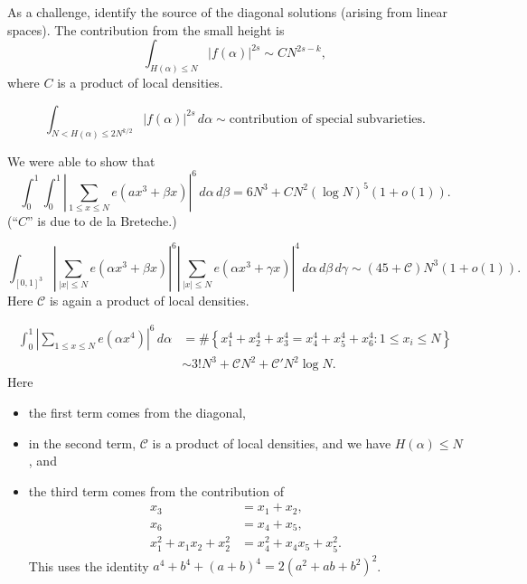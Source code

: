 \documentclass[reqno]{amsart} 
\numberwithin{theorem}{section}
\numberwithin{equation}{section}
\begin{document}
As a challenge, identify the source of the diagonal solutions (arising from linear spaces).  The contribution from the small height is
\begin{equation*}
  \int_{H(\alpha) \leq N} \left\lvert f(\alpha) \right\rvert^{2 s} \sim C N^{2 s - k},
\end{equation*}
where $C$ is a product of local densities.
\begin{conjecture}
  \begin{equation*}
    \int_{N < H(\alpha) \leq 2 N^{k/2}}
    \left\lvert f(\alpha) \right\rvert^{2 s} \, d \alpha \sim \text{contribution of special subvarieties}.
  \end{equation*}
\end{conjecture}
\begin{example}
  We were able to show that
  \begin{equation*}
    \int_0^1 \int_0^1 \left\lvert \sum_{1 \leq x \leq N} e(a x^3 + \beta x) \right\rvert^6
    \, d \alpha \, d \beta = 6 N^3 + C N^2(\log N)^5(1 + o(1)).
  \end{equation*}
  (``$C$'' is due to de la Breteche.)
\end{example}
\begin{example}
  \begin{equation*}
    \int_{[0, 1]^3} \left\lvert \sum_{\lvert x \rvert \leq N} e(\alpha x^3 + \beta x) \right\rvert^6
    \left\lvert \sum_{\lvert x \rvert \leq N} e(\alpha x^3 + \gamma x) \right\rvert^4
    \, d \alpha \, d \beta \, d \gamma
    \sim
    (45 + \mathcal{C}) N^3(1 + o(1)).
  \end{equation*}
  Here $\mathcal{C}$ is again a product of local densities.
\end{example}
\begin{example}
  \begin{align*}
    \int_0^1 \left\lvert \sum_{1 \leq x \leq N}
    e(\alpha x^4)\right\rvert^6 \, d \alpha
    &=
      \# \left\{ x_1^4 + x_2^4 + x_3^4 = x_4^4 + x_5^4 + x_6^4 : 1 \leq x_i \leq N \right\} \\
    &\sim 3! N^3 + \mathcal{C} N^2
      + \mathcal{C} ' N^2 \log N.
  \end{align*}
  Here
  \begin{itemize}
  \item the first term comes from the diagonal,
  \item in the second term, $\mathcal{C}$ is a product of local densities, and we have $H(\alpha) \leq N$, and
  \item the third term comes from the contribution of
    \begin{align*}
      x_3 &= x_1 + x_2, \\
      x_6 &= x_4 + x_5, \\
      x_1^2 + x_1 x_2 + x_2^2 &= x_4^2 + x_4 x_5 + x_5^2.
    \end{align*}
    This uses the identity $a^4 + b^4 +(a + b)^4 = 2(a^2 + a b + b^2)^2$.
  \end{itemize}
\end{example}
\end{document}
